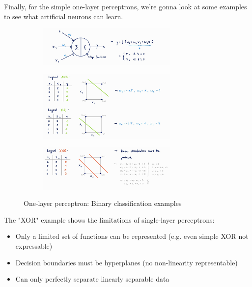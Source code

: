 Finally, for the simple one-layer perceptrons, we're gonna look at some examples to see what artificial neurons can learn.
\begin{figure}[H]
  \centering
  \begin{subfigure}{\textwidth}
    \centering
    \includegraphics[width=0.75\textwidth]{assets/nn/bg__example_architecture.png}
  \end{subfigure}

  \vspace*{0.5cm}
  \begin{subfigure}{\textwidth}
    \centering{}
    \includegraphics[width=0.75\textwidth]{assets/nn/bg__example_or_and.png}
  \end{subfigure}

  \vspace*{0.5cm}
  \begin{subfigure}{\textwidth}
    \centering{}
    \includegraphics[width=0.75\textwidth]{assets/nn/bg__example_xor.png}
  \end{subfigure}

  \caption{One-layer perceptron: Binary classification examples}
  \label{fig:6_bg_learnable_example}
\end{figure}

The "XOR" example shows the limitations of single-layer perceptrons:
\begin{itemize}
  \item Only a limited set of functions can be represented (e.g. even simple XOR not expressable)
  \item Decision boundaries must be hyperplanes (no non-linearity representable)
  \item Can only perfectly separate linearly separable data
\end{itemize}

